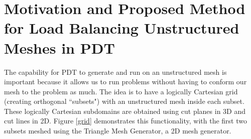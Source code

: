 \documentclass[11pt, letterpaper,titlepage,oneside]{article}
\begin{document}
\section{Motivation and Proposed Method for Load Balancing Unstructured Meshes in PDT}

The capability for PDT to generate and run on an unstructured mesh is important because it allows us to run problems without having to conform our mesh to the problem as much. The idea is to have a logically Cartesian grid (creating orthogonal ``subsets") with an unstructured mesh inside each subset. These logically Cartesian subdomains are obtained using cut planes in 3D and cut lines in 2D. Figure \ref{grid} demonstrates this functionality, with the first two subsets meshed using the Triangle Mesh Generator\cite{triangle}, a 2D mesh generator. 
\end{document}
